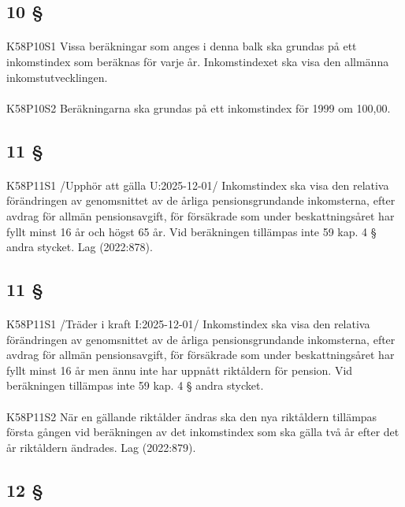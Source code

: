 \documentclass[a4paper,notitlepage,openany,10pt]{book}
\begin{document}
\subsection*{10 §}
\paragraph*{}
{\tiny K58P10S1}
Vissa beräkningar som anges i denna balk ska grundas på ett inkomstindex som beräknas för varje år. Inkomstindexet ska visa den allmänna inkomstutvecklingen.
\paragraph*{}
{\tiny K58P10S2}
Beräkningarna ska grundas på ett inkomstindex för 1999 om 100,00.
\subsection*{11 §}
\paragraph*{}
{\tiny K58P11S1}
/Upphör att gälla U:2025-12-01/
Inkomstindex ska visa den relativa förändringen av genomsnittet av de årliga pensionsgrundande inkomsterna, efter avdrag för allmän pensionsavgift, för försäkrade som under beskattningsåret har fyllt minst 16 år och högst 65 år. Vid beräkningen tillämpas inte 59 kap. 4 § andra stycket.
Lag (2022:878).
\subsection*{11 §}
\paragraph*{}
{\tiny K58P11S1}
/Träder i kraft I:2025-12-01/
Inkomstindex ska visa den relativa förändringen av genomsnittet av de årliga pensionsgrundande inkomsterna, efter avdrag för allmän pensionsavgift, för försäkrade som under beskattningsåret har fyllt minst 16 år men ännu inte har uppnått riktåldern för pension. Vid beräkningen tillämpas inte 59 kap. 4 § andra stycket.
\paragraph*{}
{\tiny K58P11S2}
När en gällande riktålder ändras ska den nya riktåldern tillämpas första gången vid beräkningen av det inkomstindex som ska gälla två år efter det år riktåldern ändrades.
Lag (2022:879).
\subsection*{12 §}
\end{document}
